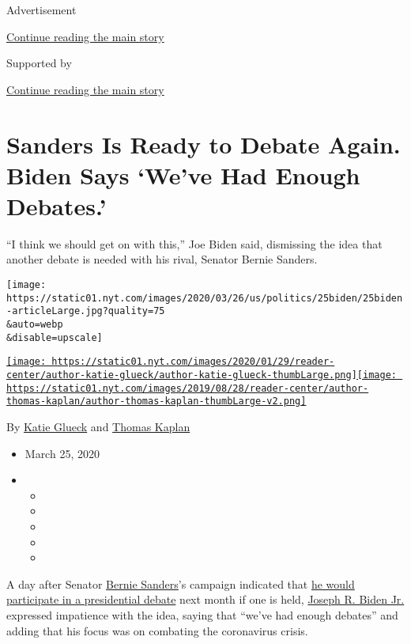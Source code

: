 Advertisement

\protect\hyperlink{after-top}{Continue reading the main story}

Supported by

\protect\hyperlink{after-sponsor}{Continue reading the main story}

\hypertarget{sanders-is-ready-to-debate-again-biden-says-weve-had-enough-debates}{%
\section{Sanders Is Ready to Debate Again. Biden Says `We've Had Enough
Debates.'}\label{sanders-is-ready-to-debate-again-biden-says-weve-had-enough-debates}}

``I think we should get on with this,'' Joe Biden said, dismissing the
idea that another debate is needed with his rival, Senator Bernie
Sanders.

\texttt{[image: https://static01.nyt.com/images/2020/03/26/us/politics/25biden/25biden-articleLarge.jpg?quality=75\\\&auto=webp\\\&disable=upscale]}

\href{https://www.nytimes.com/by/katie-glueck}{\texttt{[image: https://static01.nyt.com/images/2020/01/29/reader-center/author-katie-glueck/author-katie-glueck-thumbLarge.png]}}\href{https://www.nytimes.com/by/thomas-kaplan}{\texttt{[image: https://static01.nyt.com/images/2019/08/28/reader-center/author-thomas-kaplan/author-thomas-kaplan-thumbLarge-v2.png]}}

By \href{https://www.nytimes.com/by/katie-glueck}{Katie Glueck} and
\href{https://www.nytimes.com/by/thomas-kaplan}{Thomas Kaplan}

\begin{itemize}
\item
  March 25, 2020
\item
  \begin{itemize}
  \item
  \item
  \item
  \item
  \item
  \end{itemize}
\end{itemize}

A day after Senator
\href{https://www.nytimes.com/interactive/2020/us/elections/bernie-sanders.html}{Bernie
Sanders}'s campaign indicated that
\href{https://www.nytimes.com/2020/03/24/us/politics/biden-sanders-next-democratic-debate.html}{he
would participate in a presidential debate} next month if one is held,
\href{https://www.nytimes.com/interactive/2020/us/elections/joe-biden.html}{Joseph
R. Biden Jr.} expressed impatience with the idea, saying that ``we've
had enough debates'' and adding that his focus was on combating the
coronavirus crisis.

